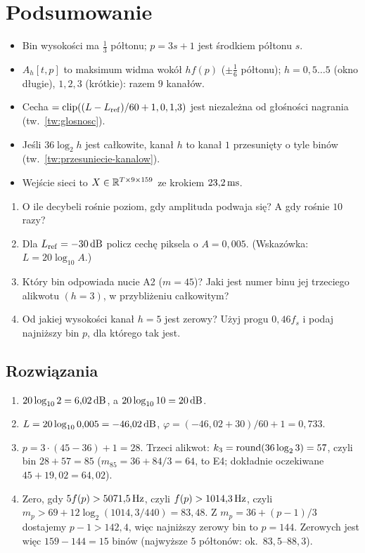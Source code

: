 \section*{Podsumowanie}
\begin{itemize}
\item Bin wysokości ma $\tfrac13$ półtonu; $p=3s+1$ jest środkiem półtonu $s$.
\item $A_h[t,p]$ to maksimum widma wokół $hf(p)$ ($\pm\frac16$ półtonu); $h=0{,}5\dots5$ (okno długie), $1,2,3$ (krótkie): razem $9$ kanałów.
\item Cecha $=\operatorname{clip}((L-L_\mathrm{ref})/60+1,0,1{,}3)$ jest niezależna od głośności nagrania (tw.~\ref{tw:glosnosc}).
\item Jeśli $36\log_2h$ jest całkowite, kanał $h$ to kanał $1$ przesunięty o tyle binów (tw.~\ref{tw:przesuniecie-kanalow}).
\item Wejście sieci to $X\in\mathbb{R}^{T\times9\times159}$ ze krokiem $23{,}2\,\mathrm{ms}$.
\end{itemize}

\begin{sprawdz}
\begin{enumerate}
\item O ile decybeli rośnie poziom, gdy amplituda podwaja się? A gdy rośnie $10$ razy?
\item Dla $L_\mathrm{ref}=-30\,\mathrm{dB}$ policz cechę piksela o $A=0{,}005$. (Wskazówka: $L=20\log_{10}A$.)
\item Który bin odpowiada nucie A2 ($m=45$)? Jaki jest numer binu jej trzeciego alikwotu $(h=3)$, w przybliżeniu całkowitym?
\item Od jakiej wysokości kanał $h=5$ jest zerowy? Użyj progu $0{,}46f_s$ i podaj najniższy bin $p$, dla którego tak jest.
\end{enumerate}
\end{sprawdz}

\subsection*{Rozwiązania}
\begin{enumerate}
\item $20\log_{10}2=6{,}02\,\mathrm{dB}$, a $20\log_{10}10=20\,\mathrm{dB}$.
\item $L=20\log_{10}0{,}005=-46{,}02\,\mathrm{dB}$, $\varphi=(-46{,}02+30)/60+1=0{,}733$.
\item $p=3\cdot(45-36)+1=28$. Trzeci alikwot: $k_3=\operatorname{round}(36\log_2 3)=57$, czyli bin $28+57=85$ ($m_{85}=36+84/3=64$, to E4; dokładnie oczekiwane $45+19{,}02=64{,}02$).
\item Zero, gdy $5f(p)>5071{,}5\,\mathrm{Hz}$, czyli $f(p)>1014{,}3\,\mathrm{Hz}$, czyli $m_p>69+12\log_2(1014{,}3/440)=83{,}48$. Z $m_p=36+(p-1)/3$ dostajemy $p-1>142{,}4$, więc najniższy zerowy bin to $p=144$. Zerowych jest więc $159-144=15$ binów (najwyższe $5$ półtonów: ok.\ $83{,}5$--$88{,}3$).
\end{enumerate}
